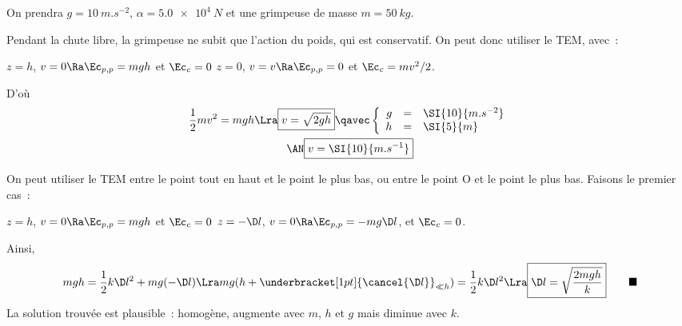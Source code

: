 \documentclass[a4paper, 11pt]{book}
\newcommand{\qed}{\tag*{$\blacksquare$}}
\renewcommand{\a}[0]{\alpha}
\begin{document}
On prendra $g = \SI{10}{m.s^{-2}}$, $\a = \SI{5.0e4}{N}$ et une grimpeuse de
masse $m = \SI{50}{kg}$. \bigbreak

{Pendant la chute libre, la grimpeuse ne subit que l'action du poids,
    qui est conservatif. On peut donc utiliser le TEM, avec~:
    \begin{itemize}[label=$\diamond$]
         $z = h$, $v=0 \Ra \Ec_{p,p} = mgh$ et
            $\Ec_c = 0$
         $z = 0$, $v=v \Ra \Ec_{p,p} = 0$ et
            $\Ec_c = mv^2/2$.
    \end{itemize}
    D'où
    \begin{gather*}
        \frac{1}{2}mv^2 = mgh
        \Lra
        \boxed{v = \sqrt{2gh}}
        \qavec
        \left\{
            \begin{array}{rcl}
                g & = & \SI{10}{m.s^{-2}}\\
                h & = & \SI{5}{m}
            \end{array}
        \right.\\
        \AN
        \boxed{v = \SI{10}{m.s^{-1}}}
    \end{gather*}
}
{On peut utiliser le TEM entre le point tout en haut et le point le
    plus bas, ou entre le point O et le point le plus bas. Faisons le
    premier cas~:
    \begin{itemize}[label=$\diamond$]
         $z = h$, $v=0 \Ra \Ec_{p,p} = mgh$ et
            $\Ec_c = 0$
         $z = -\D l$, $v=0 \Ra \Ec_{p,p}
            = -mg\D l$,  et $\Ec_c = 0$.
    \end{itemize}
    Ainsi,
    \begin{gather*}
        mgh = \frac{1}{2}k\D l^2 + mg(-\D l)
        \Lra
        mg(h+\underbracket[1pt]{\cancel{\D l}}_{\ll h}) = \frac{1}{2}k\D l^2
        \Lra
        \boxed{\D l = \sqrt{\frac{2mgh}{k}}}
        \qed
    \end{gather*}
    La solution trouvée est plausible~: homogène, augmente avec $m$, $h$ et
    $g$ mais diminue avec $k$.
}
\end{document}
